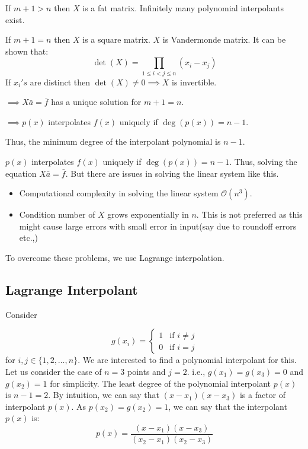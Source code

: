 \documentclass[
]{book}
\providecommand{\tightlist}{%
  \setlength{\itemsep}{0pt}\setlength{\parskip}{0pt}}
\begin{document}
If \(m+1>n\) then \(X\) is a fat matrix. Infinitely many polynomial interpolants exist.

If \(m+1=n\) then \(X\) is a square matrix. \(X\) is Vandermonde matrix. It can be shown that:
\[\det(X) = \prod_{1\le i<j\le n}(x_i-x_j)\]
If \(x_i's\) are distinct then \(\det(X)\neq 0 \implies X\) is invertible.

\(\implies X\bar{a} = \bar{f}\) has a unique solution for \(m+1=n\).

\(\implies p(x)\) interpolates \(f(x)\) uniquely if \(\deg(p(x)) = n-1\).

Thus, the minimum degree of the interpolant polynomial is \(n-1\).

\(p(x)\) interpolates \(f(x)\) uniquely if \(\deg(p(x))=n-1\). Thus, solving the equation \(X\bar{a} = \bar{f}\).
But there are issues in solving the linear system like this.

\begin{itemize}
\tightlist
\item
  Computational complexity in solving the linear system \(\mathcal{O}(n^3)\).
\item
  Condition number of \(X\) grows exponentially in \(n\). This is not preferred as this might cause large errors with small error in input(say due to roundoff errors etc.,)
\end{itemize}

To overcome these problems, we use Lagrange interpolation.

\hypertarget{lagrange-interpolant}{%
\subsection{Lagrange Interpolant}\label{lagrange-interpolant}}

Consider

\begin{equation}
g(x_i) = \begin{cases}
        1 & \text{if } i\neq j\\
        0 & \text{if } i=j
    \end{cases}
\end{equation}
for \(i,j \in \{1,2,\dots,n\}\). We are interested to find a polynomial interpolant for this. Let us consider the case of \(n=3\) points and \(j=2\). i.e., \(g(x_1)=g(x_3)=0\) and \(g(x_2)=1\) for simplicity. The least degree of the polynomial interpolant \(p(x)\) is \(n-1=2\). By intuition, we can say that \((x-x_1)(x-x_3)\) is a factor of interpolant \(p(x)\). As \(p(x_2)=g(x_2)=1\), we can say that the interpolant \(p(x)\) is:
\begin{equation}
p(x) = \frac{(x-x_1)(x-x_3)}{(x_2-x_1)(x_2-x_3)}
\end{equation}
\end{document}
